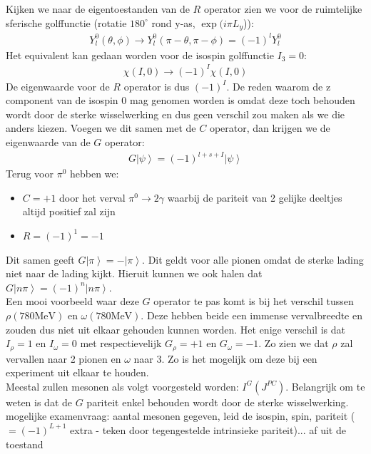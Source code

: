 \documentclass[../main.tex]{subfiles}
\begin{document}
Kijken we naar de eigentoestanden van de $R$ operator zien we voor de ruimtelijke sferische golffunctie (rotatie $180^\circ$ rond y-as, $\exp(i\pi L_y$)):
\begin{equation}
    \begin{aligned}
        \label{eq:ruimte_y_rotatie}
        Y_l^0(\theta, \phi) \rightarrow Y_l^0(\pi - \theta, \pi - \phi) = (-1)^lY_l^0
    \end{aligned}
\end{equation}
Het equivalent kan gedaan worden voor de isospin golffunctie $I_3=0$:
\begin{equation}
    \begin{aligned}
        \label{eq:isospin_y_rotatie}
        \chi(I,0) \rightarrow (-1)^I\chi(I,0)
    \end{aligned}
\end{equation}
De eigenwaarde voor de $R$ operator is dus $(-1)^I$. De reden waarom de z component van de isospin $0$ mag genomen worden is omdat deze toch behouden wordt door de sterke wisselwerking en dus geen verschil zou maken als we die anders kiezen. Voegen we dit samen met de $C$ operator, dan krijgen we de eigenwaarde van de $G$ operator:
\begin{equation}
    \begin{aligned}
        \label{eq:eigenwaarde_g}
        G\left|\psi\right>=(-1)^{l+s+I}\left|\psi\right>
    \end{aligned}
\end{equation}
Terug voor $\pi^0$ hebben we:
\begin{itemize}
    \item $C=+1$ door het verval $\pi^0\rightarrow2\gamma$ waarbij de pariteit van 2 gelijke deeltjes altijd positief zal zijn
    \item $R=(-1)^1=-1$
\end{itemize}
Dit samen geeft $G\left|\pi\right>=-\left|\pi\right>$. Dit geldt voor alle pionen omdat de sterke lading niet naar de lading kijkt. Hieruit kunnen we ook halen dat $G\left|n\pi\right>=(-1)^n\left|n\pi\right>$.\\
Een mooi voorbeeld waar deze $G$ operator te pas komt is bij het verschil tussen $\rho(780\text{MeV})$ en $\omega(780\text{MeV})$. Deze hebben beide een immense vervalbreedte en zouden dus niet uit elkaar gehouden kunnen worden. Het enige verschil is dat $I_\rho=1$ en $I_\omega=0$ met respectievelijk $G_\rho=+1$ en $G_\omega=-1$. Zo zien we dat $\rho$ zal vervallen naar 2 pionen en $\omega$ naar 3. Zo is het mogelijk om deze bij een experiment uit elkaar te houden.\\
Meestal zullen mesonen als volgt voorgesteld worden: $I^G(J^{PC})$. Belangrijk om te weten is dat de $G$ pariteit enkel behouden wordt door de sterke wisselwerking.\\

{\color{red} mogelijke examenvraag: aantal mesonen gegeven, leid de isospin, spin, pariteit ($=(-1)^{L+1}$ extra - teken door tegengestelde intrinsieke pariteit)... af uit de toestand}
\end{document}
